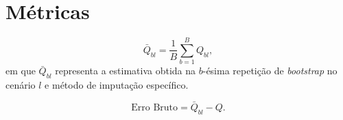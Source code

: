\section{Métricas}\label{metricas}


\begin{equation}\label{eq:medias_erro}
\bar{Q}_{bl} = \frac{1}{B} \sum_{b=1}^{B} {Q}_{bl},
\end{equation}
em que $\bar{Q}_{bl}$ representa a estimativa obtida na $b$-ésima repetição de \textit{bootstrap} no cenário $l$ e método de imputação específico.

\begin{equation}\label{eq:erro_bruto}
\text{Erro Bruto} = \bar{Q}_{bl} - Q.
\end{equation}
